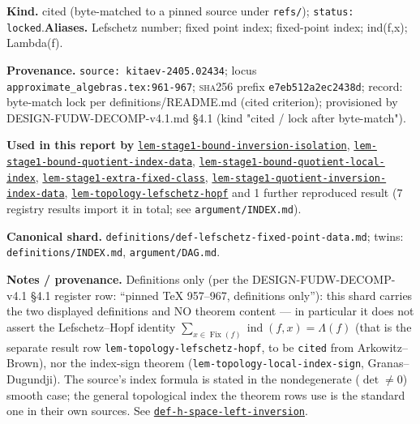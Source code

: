 \begin{defnote}
\textbf{Kind.} cited (byte-matched to a pinned source under \texttt{refs/}); \texttt{status: locked}.\quad\textbf{Aliases.} Lefschetz number; fixed point index; fixed-point index; ind(f,x); Lambda(f).
\par
\textbf{Provenance.} \texttt{source: kitaev-\allowbreak{}2405.\allowbreak{}02434}; locus \texttt{approximate\_algebras.\allowbreak{}tex:\allowbreak{}961-\allowbreak{}967}; \textsc{sha256} prefix \texttt{e7eb512a2ec2438d}; record: byte-\allowbreak{}match lock per definitions/\allowbreak{}README.\allowbreak{}md (cited criterion);\allowbreak{} provisioned by DESIGN-\allowbreak{}FUDW-\allowbreak{}DECOMP-\allowbreak{}v4.\allowbreak{}1.\allowbreak{}md \S{}4.\allowbreak{}1 (kind "cited /\allowbreak{} lock after byte-\allowbreak{}match").
\par
\textbf{Used in this report by} \hyperref[lem:stage1-bound-inversion-isolation]{\texttt{lem-\allowbreak{}stage1-\allowbreak{}bound-\allowbreak{}inversion-\allowbreak{}isolation}}, \hyperref[lem:stage1-bound-quotient-index-data]{\texttt{lem-\allowbreak{}stage1-\allowbreak{}bound-\allowbreak{}quotient-\allowbreak{}index-\allowbreak{}data}}, \hyperref[lem:stage1-bound-quotient-local-index]{\texttt{lem-\allowbreak{}stage1-\allowbreak{}bound-\allowbreak{}quotient-\allowbreak{}local-\allowbreak{}index}}, \hyperref[lem:stage1-extra-fixed-class]{\texttt{lem-\allowbreak{}stage1-\allowbreak{}extra-\allowbreak{}fixed-\allowbreak{}class}}, \hyperref[lem:stage1-quotient-inversion-index-data]{\texttt{lem-\allowbreak{}stage1-\allowbreak{}quotient-\allowbreak{}inversion-\allowbreak{}index-\allowbreak{}data}}, \hyperref[lem:topology-lefschetz-hopf]{\texttt{lem-\allowbreak{}topology-\allowbreak{}lefschetz-\allowbreak{}hopf}} and 1 further reproduced result (7 registry results import it in total; see \texttt{argument/INDEX.md}).
\par
\textbf{Canonical shard.} \texttt{definitions/\allowbreak{}def-\allowbreak{}lefschetz-\allowbreak{}fixed-\allowbreak{}point-\allowbreak{}data.\allowbreak{}md}; twins: \texttt{definitions/INDEX.md}, \texttt{argument/DAG.md}.
\par
\textbf{Notes / provenance.} Definitions only (per the DESIGN-FUDW-DECOMP-v4.1 \S{}4.1
register row: ``pinned TeX 957--967, definitions only''): this shard carries the two
displayed definitions and NO theorem content --- in particular it does not assert
the Lefschetz--Hopf identity $\sum_{x\in\operatorname{Fix}(f)}\operatorname{ind}(f,x)=\Lambda(f)$
(that is the separate result row \texttt{lem-\allowbreak{}topology-\allowbreak{}lefschetz-\allowbreak{}hopf}, to be \texttt{cited}
from Arkowitz--Brown), nor the index-sign theorem (\texttt{lem-\allowbreak{}topology-\allowbreak{}local-\allowbreak{}index-\allowbreak{}sign},
Granas--Dugundji). The source's index formula is stated in the nondegenerate
($\det\ne0$) smooth case; the general topological index the theorem rows use is
the standard one in their own sources. See \hyperref[def:h-space-left-inversion]{\texttt{def-\allowbreak{}h-\allowbreak{}space-\allowbreak{}left-\allowbreak{}inversion}}.
\end{defnote}
